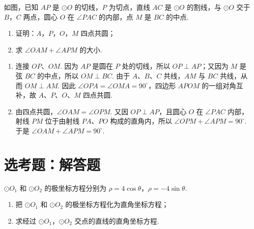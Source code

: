 \begin{problem}
如图，已知 \(AP\) 是 \(\odot O\) 的切线，\(P\) 为切点，直线 \(AC\) 是 \(\odot O\) 的割线，与 \(\odot O\) 交于 \(B\)，\(C\) 两点，圆心 \(O\) 在 \(\angle PAC\) 的内部，点 \(M\) 是 \(BC\) 的中点.

\begin{enumerate}
\item 证明：\(A\)，\(P\)，\(O\)，\(M\) 四点共圆；
\item 求 \( \angle OAM + \angle APM \) 的大小.
\end{enumerate}

\end{problem}

\begin{solution}
\begin{enumerate}
\item
连接 \(OP\)、\(OM\). 因为 \(AP\) 是圆在 \(P\) 处的切线，所以 \(OP\perp AP\)；又因为 \(M\) 是弦 \(BC\) 的中点，所以 \(OM\perp BC\). 由于 \(A\)、\(B\)、\(C\) 共线，\(AM\) 与 \(BC\) 共线，从而 \(OM\perp AM\). 因此 \(\angle OPA=\angle OMA=90^{\circ}\)，四边形 \(APOM\) 的一组对角互补，故 \(A\)、\(P\)、\(O\)、\(M\) 四点共圆.

\item
由四点共圆，\(\angle OAM=\angle OPM\). 又因 \(OP\perp AP\)，且圆心 \(O\) 在 \(\angle PAC\) 内部，射线 \(PM\) 位于由射线 \(PA\)、\(PO\) 构成的直角内，所以 \(\angle OPM+\angle APM=90^{\circ}\). 于是
\(\angle OAM+\angle APM=90^{\circ}\).
\end{enumerate}
\end{solution}

\section{选考题：解答题}

\begin{problem}
\(\odot O_{1}\) 和 \(\odot O_{2}\) 的极坐标方程分别为 \(\rho = 4\cos \theta\)，\(\rho = -4\sin \theta\).

\begin{enumerate}
\item 把 \(\odot O_{1}\) 和 \(\odot O_{2}\) 的极坐标方程化为直角坐标方程；
\item 求经过 \(\odot O_{1}\)，\(\odot O_{2}\) 交点的直线的直角坐标方程.
\end{enumerate}
\end{problem}

